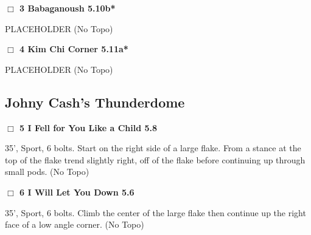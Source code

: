 \begin{multicols}{2}
\needspace{2em}
\label{rt:Babaganoush}
\colorbox{RoyalBlue!20}{
\parbox{0.95\linewidth}{
\hspace{-1ex}\textbf{$\Box$
3 Babaganoush 5.10b*  
}}}
\begin{adjustwidth}{1.3em}{}			

PLACEHOLDER
  (No Topo)
\end{adjustwidth}




\needspace{2em}
\label{rt:Kim Chi Corner}
\colorbox{RoyalBlue!20}{
\parbox{0.95\linewidth}{
\hspace{-1ex}\textbf{$\Box$
4 Kim Chi Corner 5.11a*  
}}}
\begin{adjustwidth}{1.3em}{}			

PLACEHOLDER
  (No Topo)
\end{adjustwidth}





\needspace{10em}
\subsection*{Johny Cash's Thunderdome}\label{bf:Johny Cash's Thunderdome}




\needspace{2em}
\label{rt:I Fell for You Like a Child}
\colorbox{green!20}{
\parbox{0.95\linewidth}{
\hspace{-1ex}\textbf{$\Box$
5 I Fell for You Like a Child 5.8  
}}}
\begin{adjustwidth}{1.3em}{}			

35', Sport, 6 bolts. Start on the right side of a large flake. From a stance at the top of the flake trend slightly right, off of the flake before continuing up through small pods.
  (No Topo)
\end{adjustwidth}




\needspace{2em}
\label{rt:I Will Let You Down}
\colorbox{green!20}{
\parbox{0.95\linewidth}{
\hspace{-1ex}\textbf{$\Box$
6 I Will Let You Down 5.6  
}}}
\begin{adjustwidth}{1.3em}{}			

35', Sport, 6 bolts. Climb the center of the large flake then continue up the right face of a low angle corner.
  (No Topo)
\end{adjustwidth}





\end{multicols}
